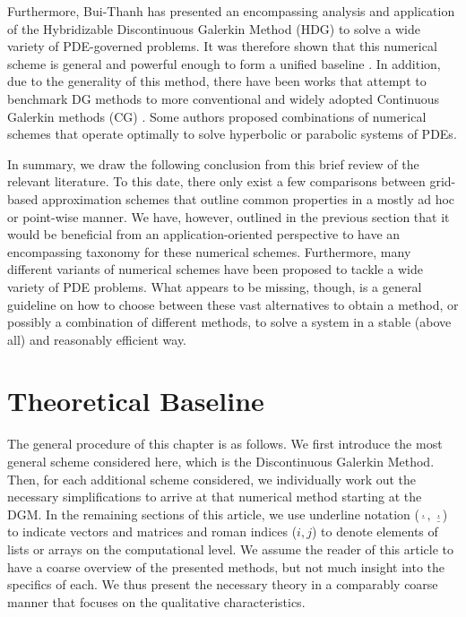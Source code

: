\documentclass[asi,article,submit,moreauthors]{Definitions/mdpi}
\begin{document}
Furthermore, Bui-Thanh has presented an encompassing analysis and application of the Hybridizable Discontinuous Galerkin Method (HDG) to solve a wide variety of PDE-governed problems.
It was therefore shown that this numerical scheme is general and powerful enough to form a unified baseline \cite{bui-thanhGodunovUnifiedHybridized2015}.
In addition, due to the generality of this method, there have been works that attempt to benchmark DG methods to more conventional and widely adopted Continuous Galerkin methods (CG) \cite{yakovlevCGHDGComparative2016,kronbichlerPerformanceComparisonContinuous2018,kirbyCGHDGComparative2012}.
Some authors proposed combinations of numerical schemes that operate optimally to solve hyperbolic \cite{gaburroUnifiedFrameworkSolution2021} or parabolic \cite{yangOptimallyEfficientTechnique2017} systems of PDEs.

In summary, we draw the following conclusion from this brief review of the relevant literature.
To this date, there only exist a few comparisons between grid-based approximation schemes that outline common properties in a mostly ad hoc or point-wise manner.
We have, however, outlined in the previous section that it would be beneficial from an application-oriented perspective to have an encompassing taxonomy for these numerical schemes.
Furthermore, many different variants of numerical schemes have been proposed to tackle a wide variety of PDE problems.
What appears to be missing, though, is a general guideline on how to choose between these vast alternatives to obtain a method, or possibly a combination of different methods, to solve a system in a stable (above all) and reasonably efficient way.

\section{Theoretical Baseline}\label{sec:baseline}

The general procedure of this chapter is as follows.
We first introduce the most general scheme considered here, which is the Discontinuous Galerkin Method.
Then, for each additional scheme considered, we individually work out the necessary simplifications to arrive at that numerical method starting at the DGM.
In the remaining sections of this article, we use underline notation ($\underline{\cdot},\,\underline{\underline{\cdot}}$) to indicate vectors and matrices and roman indices ($i,j$) to denote elements of lists or arrays on the computational level.
We assume the reader of this article to have a coarse overview of the presented methods, but not much insight into the specifics of each. We thus present the necessary theory in a comparably coarse manner that focuses on the qualitative characteristics.
\end{document}
